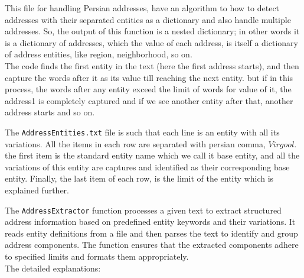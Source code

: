 \documentclass{solutionclass} %
\def\co#1{\texttt{#1}}
\begin{document}
\begin{solution}
This file for handling Persian addresses, have an algorithm to how to detect addresses with their separated entities as a dictionary and also handle multiple addresses. So, the output of this function is a nested dictionary; in other words it is a dictionary of addresses, which the value of each address, is itself a dictionary of address entities, like region, neighborhood, so on.\\
 The code finds the first entity in the text (here the first address starts), and then capture the words after it as its value till reaching the next entity. but if in this process, the words after any entity exceed the limit of words for value of it, the address1 is completely captured and if we see another entity after that, another address starts and so on.
 
 The \co{AddressEntities.txt} file is such that each line is an entity with all its variations. All the items in each row are separated with persian comma, $Virgool$. the first item is the standard entity name which we call it base entity, and all the variations of this entity are captures and identified as their corresponding base entity. Finally, the last item of each row, is the limit of the entity which is explained further.
 
The \texttt{AddressExtractor} function processes a given text to extract structured address information based on predefined entity keywords and their variations. It reads entity definitions from a file and then parses the text to identify and group address components. The function ensures that the extracted components adhere to specified limits and formats them appropriately.\\

The detailed explanations:


\end{solution}
\end{document}
